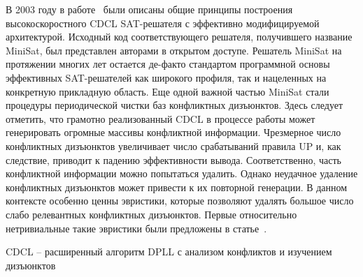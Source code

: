 В 2003 году в работе~\cite{minisat} были описаны общие принципы построения высокоскоростного CDCL SAT-решателя с эффективно модифицируемой архитектурой.
Исходный код соответствующего решателя, получившего название MiniSat, был представлен авторами в открытом доступе.
Решатель MiniSat на протяжении многих лет остается де-факто стандартом программной основы эффективных SAT-решателей как широкого профиля, так и нацеленных на конкретную прикладную область.
Еще одной важной частью MiniSat стали процедуры периодической чистки баз конфликтных дизъюнктов.
Здесь следует отметить, что грамотно реализованный CDCL в процессе работы может генерировать огромные массивы конфликтной информации.
Чрезмерное число конфликтных дизъюнктов увеличивает число срабатываний правила UP и, как следствие, приводит к падению эффективности вывода.
Соответственно, часть конфликтной информации можно попытаться удалить.
Однако неудачное удаление конфликтных дизъюнктов может привести к их повторной генерации.
В данном контексте особенно ценны эвристики, которые позволяют удалять большое число слабо релевантных конфликтных дизъюнктов.
Первые относительно нетривиальные такие эвристики были предложены в статье~\cite{glucose}.

\begin{algorithm}[!ht]
    \caption{CDCL \--- расширенный алгоритм DPLL с анализом конфликтов и изучением дизъюнктов}
    \label{alg:cdcl}
    \DontPrintSemicolon



\end{algorithm}

